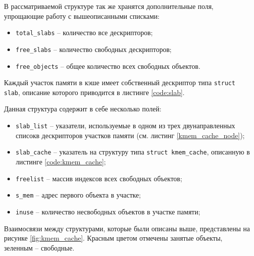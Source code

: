 В рассматриваемой структуре так же хранятся дополнительные поля, упрощающие работу с вышеописанными списками:

\begin{itemize}
	\item \texttt{total\_slabs} -- количество все дескрипторов;
	\item \texttt{free\_slabs} -- количество свободных дескрипторов;
	\item \texttt{free\_objects} -- общее количество всех свободных объектов.
\end{itemize}

Каждый участок памяти в кэше имеет собственный дескриптор типа \texttt{struct slab}, описание которого приводится в листинге \ref{code:slab}.


Данная структура содержит в себе несколько полей:

\begin{itemize}
	\item \texttt{slab\_list} -- указатели, используемые в одном из трех двунаправленных списокв дескрипторов участков памяти (см. листинг \ref{kmem_cache_node});
	\item \texttt{slab\_cache} -- указатель на структуру типа \texttt{struct kmem\_cache}, описанную в листинге \ref{code:kmem_cache};
	\item \texttt{freelist} -- массив индексов всех свободных объектов;
	\item \texttt{s\_mem} -- адрес первого объекта в участке;
	\item \texttt{inuse} -- количество несвободных объектов в участке памяти;
\end{itemize}

Взаимосвязи между структурами, которые были описаны выше, представлены на рисунке \ref{fig:kmem_cache}. Красным цветом отмечены занятые объекты, зеленным -- свободные.

